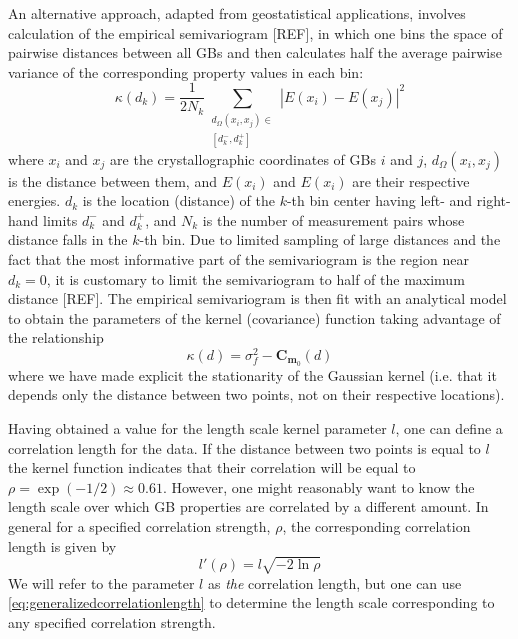 \documentclass[preprint,12pt]{elsarticle}
\begin{document}
    An alternative approach, adapted from geostatistical applications, involves calculation of the empirical semivariogram [REF], in which one bins the space of pairwise distances between all GBs and then calculates half the average pairwise variance of the corresponding property values in each bin:
    \begin{equation}
        \label{eq:semivariogram}
        \kappa\!\left(d_k\right) = \frac{1}{2N_k} \sum_{\substack{d_\Omega\left(x_i,x_j\right) \in \\ \left[d_k^-,d_k^+\right]}} {\left| E\!\left(x_i\right) - E\!\left(x_j\right)\right|}^2
    \end{equation}
    where $x_i$ and $x_j$ are the crystallographic coordinates of GBs $i$ and $j$, $d_\Omega\left(x_i,x_j\right)$ is the distance between them, and $E\!\left(x_i\right)$ and $E\!\left(x_i\right)$ are their respective energies. $d_k$ is the location (distance) of the $k$-th bin center having left- and right-hand limits $d_k^-$ and $d_k^+$, and $N_k$ is the number of measurement pairs whose distance falls in the $k$-th bin. Due to limited sampling of large distances and the fact that the most informative part of the semivariogram is the region near $d_k = 0$, it is customary to limit the semivariogram to half of the maximum distance [REF]. The empirical semivariogram is then fit with an analytical model to obtain the parameters of the kernel (covariance) function taking advantage of the relationship
    \begin{equation}
        \label{eq:analyticalsemivariogrammodel}
        \kappa\!\left(d\right) = \sigma_f^2 - \mathbf{C}_{\mathbf{m}_0}\!\left(d\right)
    \end{equation}
    where we have made explicit the stationarity of the Gaussian kernel (i.e. that it depends only the distance between two points, not on their respective locations).
    
    Having obtained a value for the length scale kernel parameter $l$, one can define a correlation length for the data. If the distance between two points is equal to $l$ the kernel function indicates that their correlation will be equal to $\rho = \exp{\left(-1/2\right)} \approx 0.61$. However, one might reasonably want to know the length scale over which GB properties are correlated by a different amount. In general for a specified correlation strength, $\rho$, the corresponding correlation length is given by
    \begin{equation}
        \label{eq:generalizedcorrelationlength}
        l'\!\left(\rho\right) = l \sqrt{-2 \ln{\rho}}
    \end{equation}
    We will refer to the parameter $l$ as \emph{the} correlation length, but one can use \cref{eq:generalizedcorrelationlength} to determine the length scale corresponding to any specified correlation strength. %
\end{document}

